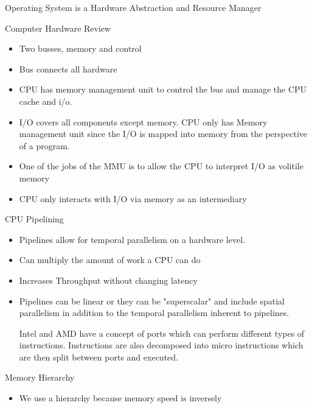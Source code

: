 \documentclass{report}
\begin{document}
\begin{description}
\begin{itemize}
        \end{itemize}
    \item Operating System is a Hardware Abstraction and Resource Manager
    \item Computer Hardware Review
        \begin{itemize}
            \item Two busses, memory and control
            \item Bus connects all hardware
            \item CPU has memory management unit to control the bus and
                manage the CPU cache and i/o.
            \item I/O covers all components except memory. CPU only
                has Memory management unit since the I/O is mapped
                into memory from the perspective of a program.
            \item One of the jobs of the MMU is to allow the CPU to
                interpret I/O as volitile memory
            \item CPU only interacts with I/O via memory as an intermediary
        \end{itemize}
    \item CPU Pipelining
        \begin{itemize}
            \item Pipelines allow for temporal parallelism on a hardware
                level.
            \item Can multiply the amount of work a CPU can do
            \item Increases Throughput without changing latency
            \item Pipelines can be linear or they can be "superscalar"
                and include spatial parallelism in addition to the
                temporal parallelism inherent to pipelines.
                \begin{mdframed}
                    Intel and AMD have a concept of ports which
                    can perform different types of instructions.
                    Instructions are also decomposed into micro instructions
                    which are then split between ports and executed.
                \end{mdframed}
        \end{itemize}
    \item Memory Hierarchy
        \begin{itemize}
            \item We use a hierarchy because memory speed is inversely

\end{itemize}
\end{description}
\end{document}
